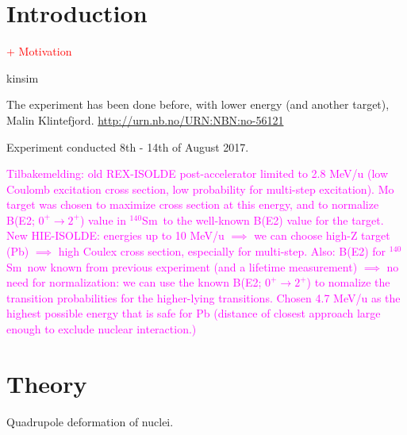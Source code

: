 \documentclass[twoside,english]{uiofysmaster/uiofysmaster}
\newcommand{\Sm}{$^{140}$Sm} %
\begin{document}

\chapter{Introduction}
\textcolor{red}{+ Motivation}


kinsim \cite{kinsim}

The experiment has been done before, with lower energy (and another target), Malin Klintefjord. \url{http://urn.nb.no/URN:NBN:no-56121} \newline
 
 
Experiment conducted 8th - 14th of August 2017.

\bigskip

\textcolor{Magenta}{Tilbakemelding: \newline 
old REX-ISOLDE post-accelerator limited to 2.8 MeV/u (low Coulomb excitation cross section, low probability for multi-step excitation). Mo target was chosen to maximize cross section at this energy, and to normalize B(E2; $0^+ \rightarrow 2^+$) value in \Sm ~to the well-known B(E2) value for the target. \newline
New HIE-ISOLDE: energies up to 10 MeV/u $\implies$ we can choose high-Z target (Pb) $\implies$ high Coulex cross section, especially for multi-step. Also: B(E2) for \Sm ~now known from previous experiment (and a lifetime measurement) $\implies$ no need for normalization: we can use the known B(E2; $0^+ \rightarrow 2^+$) to nomalize the transition probabilities for the higher-lying transitions. Chosen 4.7 MeV/u as the highest possible energy that is safe for Pb (distance of closest approach large enough to exclude nuclear interaction.)}



\chapter{Theory}

Quadrupole deformation of nuclei. \newline
\end{document}
